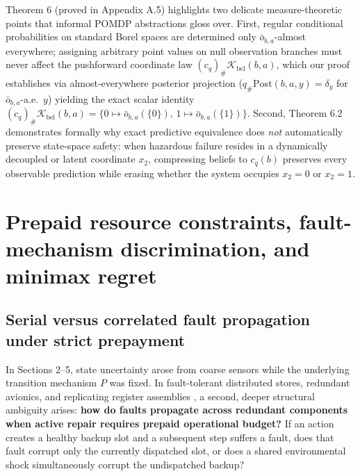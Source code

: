 \documentclass[11pt,a4paper]{article}
\begin{document}
Theorem 6 (proved in Appendix A.5) highlights two delicate
measure-theoretic points that informal POMDP abstractions gloss over.
First, regular conditional probabilities on standard Borel spaces are
determined only \(\bar{o}_{b,a}\)-almost everywhere; assigning arbitrary
point values on null observation branches must never affect the
pushforward coordinate law \((c_q)_\# \mathcal{K}_{\mathrm{bel}}(b,a)\),
which our proof establishes via almost-everywhere posterior projection
(\(q_\# \mathrm{Post}(b,a,y) = \delta_y\) for
\(\bar{o}_{b,a}\)-a.e.~\(y\)) yielding the exact scalar identity
\((c_q)_\# \mathcal{K}_{\mathrm{bel}}(b,a) = \{0 \mapsto \bar{o}_{b,a}(\{0\}),\, 1 \mapsto \bar{o}_{b,a}(\{1\})\}\).
Second, Theorem 6.2 demonstrates formally why exact predictive
equivalence \citep{shaliziCrutchfield2001, littmanSuttonSingh2001} does
\emph{not} automatically preserve state-space safety: when hazardous
failure resides in a dynamically decoupled or latent coordinate \(x_2\),
compressing beliefs to \(c_q(b)\) preserves every observable prediction
while erasing whether the system occupies \(x_2 = 0\) or \(x_2 = 1\).

\section{Prepaid resource constraints, fault-mechanism discrimination,
and minimax
regret}\label{prepaid-resource-constraints-fault-mechanism-discrimination-and-minimax-regret}

\subsection{Serial versus correlated fault propagation under strict
prepayment}\label{serial-versus-correlated-fault-propagation-under-strict-prepayment}

In Sections 2--5, state uncertainty arose from coarse sensors while the
underlying transition mechanism \(P\) was fixed. In fault-tolerant
distributed stores, redundant avionics, and replicating register
assemblies \citep{athreyaNey1972, altman1999, cassandrasLafortune2021},
a second, deeper structural ambiguity arises: \textbf{how do faults
propagate across redundant components when active repair requires
prepaid operational budget?} If an action creates a healthy backup slot
and a subsequent step suffers a fault, does that fault corrupt only the
currently dispatched slot, or does a shared environmental shock
simultaneously corrupt the undispatched backup?
\end{document}
